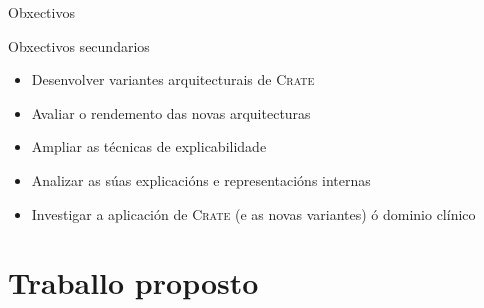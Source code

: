 \documentclass{beamer}
\begin{document}
\begin{frame}{Obxectivos}
    \begin{block}{Obxectivos secundarios}
        \begin{itemize}
             \item Desenvolver variantes arquitecturais de \textsc{Crate} \pause
						 \item Avaliar o rendemento das novas arquitecturas \pause
             \item Ampliar as técnicas de explicabilidade \pause
             \item Analizar as súas explicacións e representacións internas \pause
						 \item Investigar a aplicación de \textsc{Crate} (e as novas variantes) ó dominio clínico
        \end{itemize}
    \end{block}
\end{frame}
%
%
%
%
%






\section{Traballo proposto}
\end{document}
